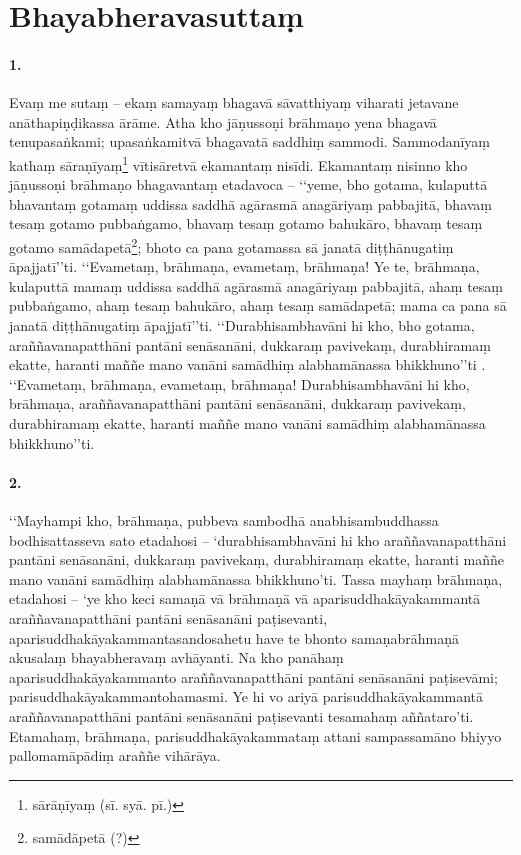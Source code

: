 \section{Bhayabheravasuttaṃ}

\paragraph{1.} Evaṃ me sutaṃ – ekaṃ samayaṃ bhagavā sāvatthiyaṃ viharati jetavane anāthapiṇḍikassa ārāme. Atha kho jāṇussoṇi brāhmaṇo yena bhagavā tenupasaṅkami; upasaṅkamitvā bhagavatā saddhiṃ sammodi. Sammodanīyaṃ kathaṃ sāraṇīyaṃ\footnote{sārāṇīyaṃ (sī. syā. pī.)} vītisāretvā ekamantaṃ nisīdi. Ekamantaṃ nisinno kho jāṇussoṇi brāhmaṇo bhagavantaṃ etadavoca – ‘‘yeme, bho gotama, kulaputtā bhavantaṃ gotamaṃ uddissa saddhā agārasmā anagāriyaṃ pabbajitā, bhavaṃ tesaṃ gotamo pubbaṅgamo, bhavaṃ tesaṃ gotamo bahukāro, bhavaṃ tesaṃ gotamo samādapetā\footnote{samādāpetā (?)}; bhoto ca pana gotamassa sā janatā diṭṭhānugatiṃ āpajjatī’’ti. ‘‘Evametaṃ, brāhmaṇa, evametaṃ, brāhmaṇa! Ye te, brāhmaṇa, kulaputtā mamaṃ uddissa saddhā agārasmā anagāriyaṃ pabbajitā, ahaṃ tesaṃ pubbaṅgamo, ahaṃ tesaṃ bahukāro, ahaṃ tesaṃ samādapetā; mama ca pana sā janatā diṭṭhānugatiṃ āpajjatī’’ti. ‘‘Durabhisambhavāni hi kho, bho gotama, araññavanapatthāni pantāni senāsanāni, dukkaraṃ pavivekaṃ, durabhiramaṃ ekatte, haranti maññe mano vanāni samādhiṃ alabhamānassa bhikkhuno’’ti . ‘‘Evametaṃ, brāhmaṇa, evametaṃ, brāhmaṇa! Durabhisambhavāni hi kho, brāhmaṇa, araññavanapatthāni pantāni senāsanāni, dukkaraṃ pavivekaṃ, durabhiramaṃ ekatte, haranti maññe mano vanāni samādhiṃ alabhamānassa bhikkhuno’’ti.

\paragraph{2.} ‘‘Mayhampi kho, brāhmaṇa, pubbeva sambodhā anabhisambuddhassa bodhisattasseva sato etadahosi – ‘durabhisambhavāni hi kho araññavanapatthāni pantāni senāsanāni, dukkaraṃ pavivekaṃ, durabhiramaṃ ekatte, haranti maññe mano vanāni samādhiṃ alabhamānassa bhikkhuno’ti. Tassa mayhaṃ brāhmaṇa, etadahosi – ‘ye kho keci samaṇā vā brāhmaṇā vā aparisuddhakāyakammantā araññavanapatthāni pantāni senāsanāni paṭisevanti, aparisuddhakāyakammantasandosahetu have te bhonto samaṇabrāhmaṇā akusalaṃ bhayabheravaṃ avhāyanti. Na kho panāhaṃ aparisuddhakāyakammanto araññavanapatthāni pantāni senāsanāni paṭisevāmi; parisuddhakāyakammantohamasmi. Ye hi vo ariyā parisuddhakāyakammantā araññavanapatthāni pantāni senāsanāni paṭisevanti tesamahaṃ aññataro’ti. Etamahaṃ, brāhmaṇa, parisuddhakāyakammataṃ attani sampassamāno bhiyyo pallomamāpādiṃ araññe vihārāya.

